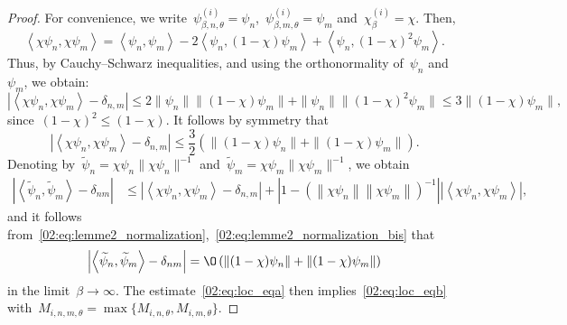 \begin{proof}
        For convenience, we write~$\psi^{(i)}_{\beta,n,\theta} = \psi_n$,~$\psi^{(i)}_{\beta,m,\theta}=\psi_m$ and~$\chi_\beta^{(i)}=\chi$. Then,
        \[\left\langle \chi \psi_n,\chi \psi_m\right\rangle = \left\langle \psi_n,\psi_m\right\rangle - 2\left\langle \psi_n,(1-\chi)\psi_m\right\rangle + \left\langle\psi_n,(1-\chi)^2\psi_m\right\rangle.\]
        Thus, by Cauchy--Schwarz inequalities, and using the orthonormality of~$\psi_n$ and~$\psi_m$, we obtain:
       \[ \left|\left\langle \chi\psi_n,\chi\psi_m\right\rangle - \delta_{n,m}\right| \leq 2 \|\psi_n\|\|(1-\chi)\psi_m\| + \|\psi_n\|\|(1-\chi)^2\psi_m\| \leq 3\|(1-\chi)\psi_m\|,\]
       since~$(1-\chi)^2\leq (1-\chi)$. It follows by symmetry that
       \begin{equation}
       \label{02:eq:lemme2_normalization_bis}
       \left|\left\langle \chi\psi_n,\chi\psi_m\right\rangle - \delta_{n,m}\right|\leq \frac32\left(\|(1-\chi)\psi_n\|+\|(1-\chi)\psi_m\|\right).
       \end{equation}
       Denoting by~$\widetilde \psi_n = \chi\psi_n\|\chi\psi_n\|^{-1}$ and~$\widetilde \psi_m = \chi\psi_m\|\chi\psi_m\|^{-1}$, we obtain
       \[\begin{aligned}
        \left|\left\langle \widetilde \psi_n,\widetilde \psi_m\right\rangle -\delta_{nm}\right|&\leq\left|\left\langle \chi \psi_n,\chi\psi_m\right\rangle - \delta_{n,m}\right| + \left|1-\left(\left\|\chi\psi_n\right\|\left\|\chi\psi_m\right\|\right)^{-1}\right|\left|\left\langle \chi \psi_n,\chi\psi_m\right\rangle\right|,
       \end{aligned}\]
       and it follows from~\eqref{02:eq:lemme2_normalization},~\eqref{02:eq:lemme2_normalization_bis} that
       \[\left|\left\langle \widetilde \psi_n,\widetilde \psi_m\right\rangle -\delta_{nm}\right|=\O\left(\|(1-\chi)\psi_n\|+\|(1-\chi)\psi_m\|\right)\]
       in the limit~$\beta\to\infty$. The estimate~\eqref{02:eq:loc_eqa} then implies~\eqref{02:eq:loc_eqb} with~$M_{i,n,m,\theta} = \max\{M_{i,n,\theta},M_{i,m,\theta}\}$.


\end{proof}
